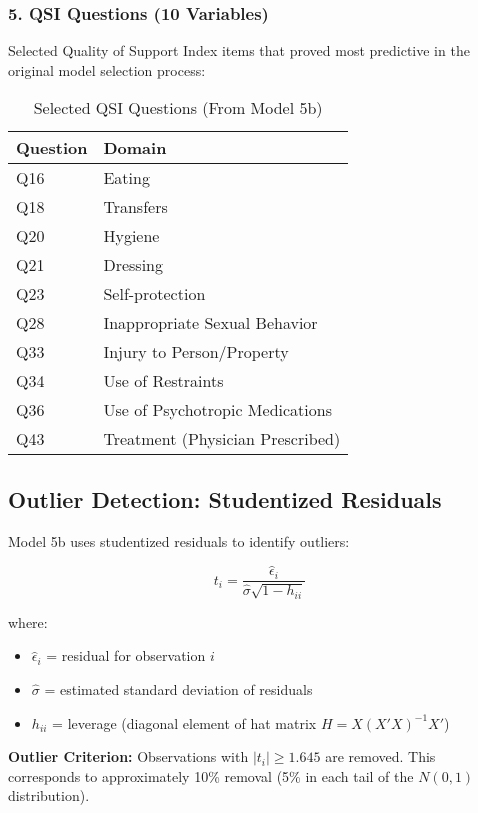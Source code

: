 \subsubsection{5. QSI Questions (10 Variables)}

Selected Quality of Support Index items that proved most predictive in the original model selection process:

\begin{table}[ht]
\centering
\caption{Selected QSI Questions (From Model 5b)}
\begin{tabular}{ll}
\toprule
\textbf{Question} & \textbf{Domain} \\
\midrule
Q16 & Eating \\
Q18 & Transfers \\
Q20 & Hygiene \\
Q21 & Dressing \\
Q23 & Self-protection \\
Q28 & Inappropriate Sexual Behavior \\
Q33 & Injury to Person/Property \\
Q34 & Use of Restraints \\
Q36 & Use of Psychotropic Medications \\
Q43 & Treatment (Physician Prescribed) \\
\bottomrule
\end{tabular}
\end{table}

\subsection{Outlier Detection: Studentized Residuals}

Model 5b uses studentized residuals to identify outliers:

\begin{equation}
t_i = \frac{\hat{\epsilon}_i}{\hat{\sigma}\sqrt{1 - h_{ii}}}
\end{equation}

where:
\begin{itemize}
    \item $\hat{\epsilon}_i$ = residual for observation $i$
    \item $\hat{\sigma}$ = estimated standard deviation of residuals
    \item $h_{ii}$ = leverage (diagonal element of hat matrix $H = X(X'X)^{-1}X'$)
\end{itemize}

\textbf{Outlier Criterion:} Observations with $|t_i| \geq 1.645$ are removed. This corresponds to approximately 10\% removal (5\% in each tail of the $N(0,1)$ distribution).


